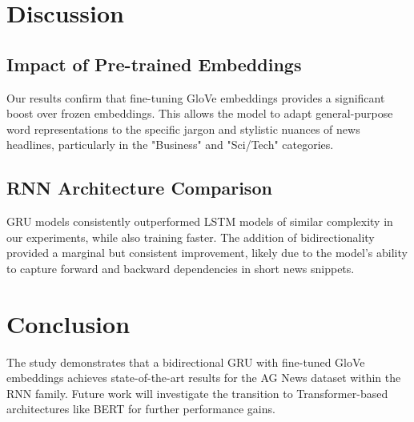 \documentclass[11pt, a4paper]{article}
\begin{document}
\section{Discussion}
\subsection{Impact of Pre-trained Embeddings}
Our results confirm that fine-tuning GloVe embeddings provides a significant boost over frozen embeddings. This allows the model to adapt general-purpose word representations to the specific jargon and stylistic nuances of news headlines, particularly in the "Business" and "Sci/Tech" categories.

\subsection{RNN Architecture Comparison}
GRU models consistently outperformed LSTM models of similar complexity in our experiments, while also training faster. The addition of bidirectionality provided a marginal but consistent improvement, likely due to the model's ability to capture forward and backward dependencies in short news snippets.

\section{Conclusion}
The study demonstrates that a bidirectional GRU with fine-tuned GloVe embeddings achieves state-of-the-art results for the AG News dataset within the RNN family. Future work will investigate the transition to Transformer-based architectures like BERT for further performance gains.
\end{document}
